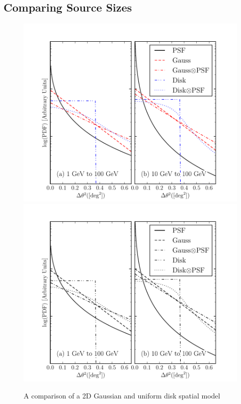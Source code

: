 \subsection{Comparing Source Sizes}


\begin{figure}[htbp]
    \ifcolorfigure
      \includegraphics{mc_plots/compare_disk_gauss_color.pdf}
    \else
      \includegraphics{mc_plots/compare_disk_gauss_bw.pdf}
    \fi
    \caption{
    A comparison of a 2D Gaussian and uniform disk spatial model
}
\end{figure}
